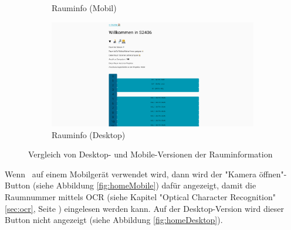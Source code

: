 \begin{figure}[H]
\begin{subfigure}[b]{0.34\textwidth}
        \caption{Rauminfo (Mobil)}
    \end{subfigure} \hfill
    \begin{subfigure}[b]{0.64\textwidth}
        \centering
        \includegraphics[width=\textwidth]{media/ResponsiveDesign/ZeliaDesktop.png}
        \caption{Rauminfo (Desktop)}
    \end{subfigure} 
    \caption{Vergleich von Desktop- und Mobile-Versionen der Rauminformation}
    \label{fig:info}
\end{figure}
\clearpage
{}

Wenn \ZELIA\ auf einem Mobilgerät verwendet wird, dann wird der "Kamera öffnen"-Button (siehe Abbildung \ref{fig:homeMobile}) dafür angezeigt, damit die Raumnummer mittels OCR (siehe Kapitel "Optical Character Recognition" \ref{sec:ocr}, Seite \pageref{sec:ocr}) eingelesen werden kann. Auf der Desktop-Version wird dieser Button nicht angezeigt (siehe Abbildung \ref{fig:homeDesktop}).

